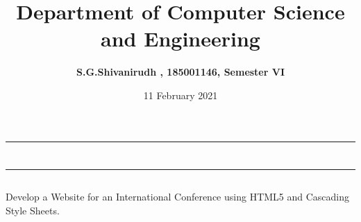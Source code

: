 \documentclass[12pt,letterpaper]{article}
\title{\textbf{Department of Computer Science and Engineering}}
\author{\textbf{S.G.Shivanirudh , 185001146, Semester VI }}
\date{11 February 2021}
\begin{document}
\maketitle
\hrule
\section*{}
\hrule 
\bigskip\bigskip

\subsection*{}

\subsection*{}
\begin{flushleft}
    Develop a Website for an International Conference using HTML5 and Cascading Style Sheets. 
\end{flushleft}

\subsection*{}
\subsubsection*{}
\begin{flushleft}

\end{flushleft}

\subsubsection*{}
\begin{flushleft}

\end{flushleft}

\subsubsection*{}
\begin{flushleft}

\end{flushleft}
\end{document}
